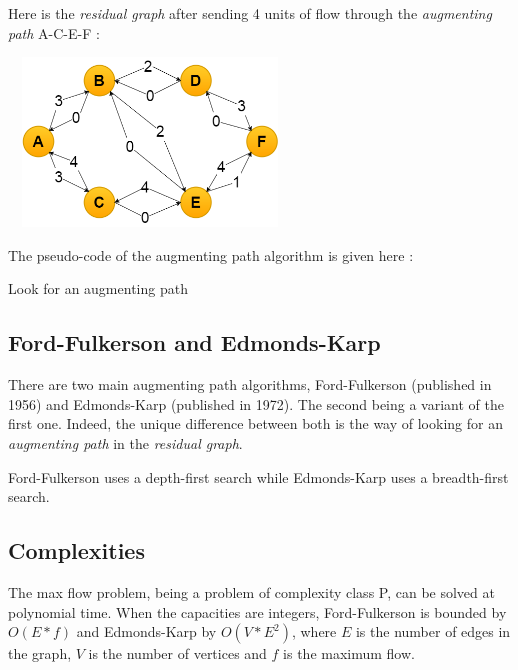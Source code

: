 Here is the \textit{residual graph} after sending 4 units of flow through the \textit{augmenting path} A-C-E-F : \newline

\begin{center}
\includegraphics[width=7.5cm,height=4.5cm]{images/residualgraph2.png}
\end{center}

The pseudo-code of the augmenting path algorithm is given here :

\begin{algorithm}[h]

 Look for an augmenting path\;
\end{algorithm}

\subsection{Ford-Fulkerson and Edmonds-Karp}
There are two main augmenting path algorithms, Ford-Fulkerson (published in 1956) and Edmonds-Karp (published in 1972). The second being a variant of the first one. Indeed, the unique difference between both is the way of looking for an \textit{augmenting path} in the \textit{residual graph}. \newline

Ford-Fulkerson uses a depth-first search while Edmonds-Karp uses a breadth-first search.



\subsection{Complexities}
The max flow problem, being a problem of complexity class P, can be solved at polynomial time. When the capacities are integers, Ford-Fulkerson is bounded by $O(E*f)$ and Edmonds-Karp by $O(V*E^2)$, where $E$ is the number of edges in the graph, $V$ is the number of vertices and $f$ is the maximum flow.

